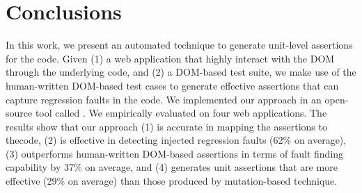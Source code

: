 \section{Conclusions} \label{Sec:concs}
In this work, we present an automated technique to generate unit-level assertions for the \javascript code. Given (1) a web application that highly interact with the DOM through the underlying \javascript code, and (2) a DOM-based test suite, we make use of the human-written DOM-based test cases to generate effective assertions that can capture regression faults in the \javascript code. We implemented our approach in an open-source tool called \atrina. We empirically evaluated \atrina on four web applications. The results show that our approach (1) is accurate in mapping the assertions to the\javascript code, (2) is effective in detecting injected regression faults (62\% on average), (3) outperforms human-written DOM-based assertions in terms of fault finding capability by 37\% on average, and (4) generates unit assertions that are more effective (29\% on average) than those produced by mutation-based technique.